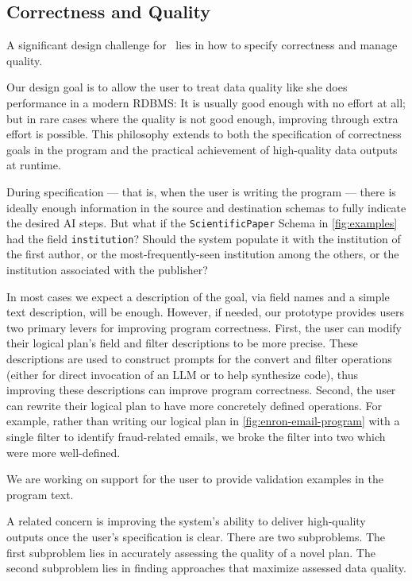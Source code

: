 

\subsection{Correctness and Quality}
\label{sec:quality}
A significant design challenge for \system\ lies in how to specify correctness and manage quality.

Our design goal is to allow the user to treat data quality like she does performance in a modern RDBMS: It is usually good enough with no effort at all; but in rare cases where the quality is not good enough, improving through extra effort is possible. This philosophy extends to both the specification of correctness goals in the program and the practical achievement of high-quality data outputs at runtime.

 During specification --- that is, when the user is writing the program --- there is ideally enough information in the source and destination schemas to fully indicate the desired AI steps. But what if the {\tt ScientificPaper} Schema in \autoref{fig:examples} had the field {\tt institution}?  Should the system populate it with the institution of the first author, or the most-frequently-seen institution among the others, or the institution associated with the publisher?  

In most cases we expect a description of the goal, via field names and a simple text description, will be enough. However, if needed, our prototype provides users two primary levers for improving program correctness. First, the user can modify their logical plan's field and filter descriptions to be more precise. These descriptions are used to construct prompts for the convert and filter operations (either for direct invocation of an LLM or to help synthesize code), thus improving these descriptions can improve program correctness. Second, the user can rewrite their logical plan to have more concretely defined operations. For example, rather than writing our logical plan in \autoref{fig:enron-email-program} with a single filter to identify fraud-related emails, we broke the filter into two which were more well-defined.

We are working on support for the user to provide validation examples in the program text.

 A related concern is improving the system's ability to deliver high-quality outputs once the user's specification is clear. There are two subproblems. The first subproblem lies in accurately assessing the quality of a novel plan. The second subproblem lies in finding approaches that maximize assessed data quality.

